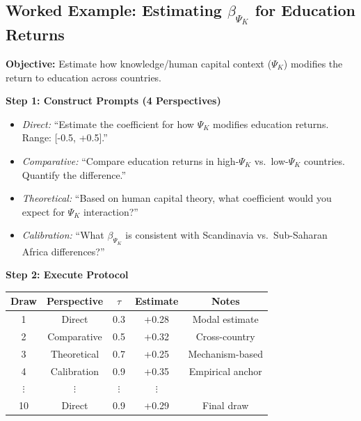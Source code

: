 
\subsection{Worked Example: Estimating $\beta_{\Psi_K}$ for Education Returns}
\label{sec:AN-example}

\begin{tcolorbox}[colback=blue!5!white, colframe=blue!75!black,
    title=\textbf{Worked Example: LLM-MC Protocol Application}]

\textbf{Objective:} Estimate how knowledge/human capital context ($\Psi_K$)
modifies the return to education across countries.

\textbf{Step 1: Construct Prompts (4 Perspectives)}

\begin{itemize}[nosep]
    \item \textit{Direct:} ``Estimate the coefficient for how $\Psi_K$ modifies
          education returns. Range: [-0.5, +0.5].''
    \item \textit{Comparative:} ``Compare education returns in high-$\Psi_K$
          vs.\ low-$\Psi_K$ countries. Quantify the difference.''
    \item \textit{Theoretical:} ``Based on human capital theory, what coefficient
          would you expect for $\Psi_K$ interaction?''
    \item \textit{Calibration:} ``What $\beta_{\Psi_K}$ is consistent with
          Scandinavia vs.\ Sub-Saharan Africa differences?''
\end{itemize}

\textbf{Step 2: Execute Protocol}

\begin{center}
\small
\begin{tabular}{@{}ccccc@{}}
\toprule
Draw & Perspective & $\tau$ & Estimate & Notes \\
\midrule
1 & Direct & 0.3 & +0.28 & Modal estimate \\
2 & Comparative & 0.5 & +0.32 & Cross-country \\
3 & Theoretical & 0.7 & +0.25 & Mechanism-based \\
4 & Calibration & 0.9 & +0.35 & Empirical anchor \\
$\vdots$ & $\vdots$ & $\vdots$ & $\vdots$ & \\
10 & Direct & 0.9 & +0.29 & Final draw \\
\bottomrule
\end{tabular}
\end{center}


\end{tcolorbox}
